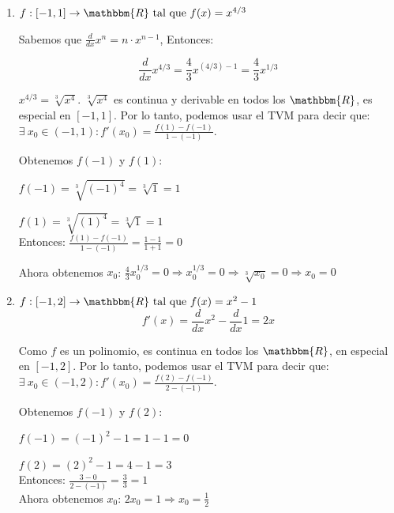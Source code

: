 \documentclass[12pt]{article}
\begin{document}
\begin{enumerate}[\hspace{9px} a)]
    \item \(f: [-1,1] \rightarrow \mathbbm{R} \ \text{tal que} \ f(x)=x^{4/3}\)\medskip

        Sabemos que \(\displaystyle\frac{d}{dx}x^n=n\cdot x^{n-1}\), Entonces:

        \[\displaystyle\frac{d}{dx}x^{4/3}=\frac{4}{3}x^{(4/3)-1}=\frac{4}{3}x^{1/3}\]

        \(x^{4/3}=\sqrt[3]{x^4}\). \quad $\sqrt[3]{x^4}$ es continua y derivable en todos los $\mathbbm{R}$, es especial en $[-1,1]$. Por lo tanto, podemos usar el TVM para decir que: \(\exists \ x_0 \in (-1,1) : f'(x_0)=\displaystyle\frac{f(1)-f(-1)}{1-(-1)}\).

        Obtenemos $f(-1)$ y $f(1)$:

        \(f(-1)=\sqrt[3]{(-1)^4}=\sqrt[3]{1}=1\)

        \(f(1)=\sqrt[3]{(1)^4}=\sqrt[3]{1}=1\)\\

        Entonces: \quad \(\displaystyle\frac{f(1)-f(-1)}{1-(-1)}=\frac{1-1}{1+1}=0\)

        Ahora obtenemos $x_0$: \quad \(\displaystyle\frac{4}{3}x_0^{1/3}=0 \Longrightarrow x_0^{1/3}=0 \Rightarrow \sqrt[3]{x_0}=0 \Rightarrow x_0=0\)\\

    \item \(f: [-1,2] \rightarrow \mathbbm{R} \ \text{tal que} \ f(x)=x^2-1\)\\

        \[f'(x)=\displaystyle\frac{d}{dx}x^2-\frac{d}{dx}1=2x\]

        Como $f$ es un polinomio, es continua en todos los $\mathbbm{R}$, en especial en $[-1,2]$. Por lo tanto, podemos usar el TVM para decir que: \(\exists \ x_0 \in (-1,2) : f'(x_0)=\displaystyle\frac{f(2)-f(-1)}{2-(-1)}\).

        Obtenemos $f(-1)$ y $f(2)$:

        \(f(-1)=(-1)^2-1=1-1=0\)

        \(f(2)=(2)^2-1=4-1=3\)\\

        Entonces: \quad \(\displaystyle\frac{3-0}{2-(-1)}=\frac{3}{3}=1\)\\

        Ahora obtenemos $x_0$: \quad \(2x_0=1 \Rightarrow x_0=\frac{1}{2}\)\\


\end{enumerate}
\end{document}
